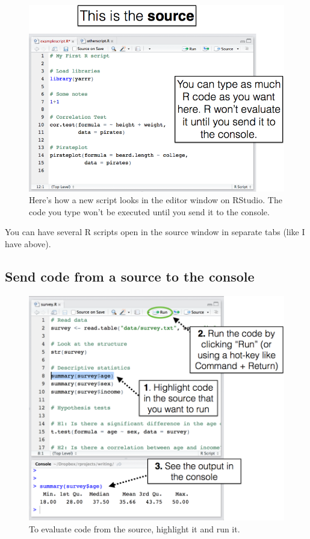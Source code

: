 \documentclass[
]{book}
\begin{document}
\begin{figure}

{\centering \includegraphics[width=0.75\linewidth]{images/sourcess} 

}

\caption{Here's how a new script looks in the editor window on RStudio. The code you type won't be executed until you send it to the console.}\label{fig:editor}
\end{figure}

You can have several R scripts open in the source window in separate tabs (like I have above).

\hypertarget{send-code-from-a-source-to-the-console}{%
\subsection{Send code from a source to the console}\label{send-code-from-a-source-to-the-console}}

\begin{figure}

{\centering \includegraphics[width=0.75\linewidth]{images/runningcode} 

}

\caption{To evaluate code from the source, highlight it and run it.}\label{fig:runcode}
\end{figure}
\end{document}
